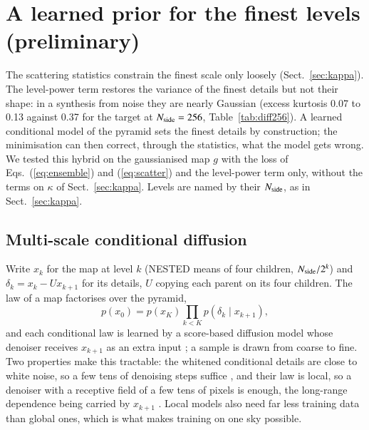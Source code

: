 \documentclass{aa}
\newcommand{\nside}{N_{\rm side}}
\begin{document}
\section{A learned prior for the finest levels (preliminary)}
\label{app:diffusion}

The scattering statistics constrain the finest scale only loosely (Sect.~\ref{sec:kappa}). The level-power term restores the variance of the finest details but not their shape: in a synthesis from noise they are nearly Gaussian (excess kurtosis 0.07 to 0.13 against 0.37 for the target at $\nside=256$, Table~\ref{tab:diff256}). A learned conditional model of the pyramid sets the finest details by construction; the minimisation can then correct, through the statistics, what the model gets wrong. We tested this hybrid on the gaussianised \citet{takahashi2017} map $g$ with the loss of Eqs.~(\ref{eq:ensemble}) and (\ref{eq:scatter}) and the level-power term only, without the terms on $\kappa$ of Sect.~\ref{sec:kappa}. Levels are named by their $\nside$, as in Sect.~\ref{sec:kappa}.

\subsection{Multi-scale conditional diffusion}

Write $x_k$ for the map at level $k$ (NESTED means of four children, $\nside/2^k$) and $\delta_k = x_k - U x_{k+1}$ for its details, $U$ copying each parent on its four children. The law of a map factorises over the pyramid,
\begin{equation}
p(x_0) = p(x_K)\prod_{k<K} p(\delta_k \mid x_{k+1}),
\end{equation}
and each conditional law is learned by a score-based diffusion model \citep{ho2020,song2021} whose denoiser receives $x_{k+1}$ as an extra input \citep{guth2022,kadkhodaie2023}; a sample is drawn from coarse to fine. Two properties make this tractable: the whitened conditional details are close to white noise, so a few tens of denoising steps suffice \citep{guth2022}, and their law is local, so a denoiser with a receptive field of a few tens of pixels is enough, the long-range dependence being carried by $x_{k+1}$ \citep{kadkhodaie2023}. Local models also need far less training data than global ones, which is what makes training on one sky possible.
\end{document}
